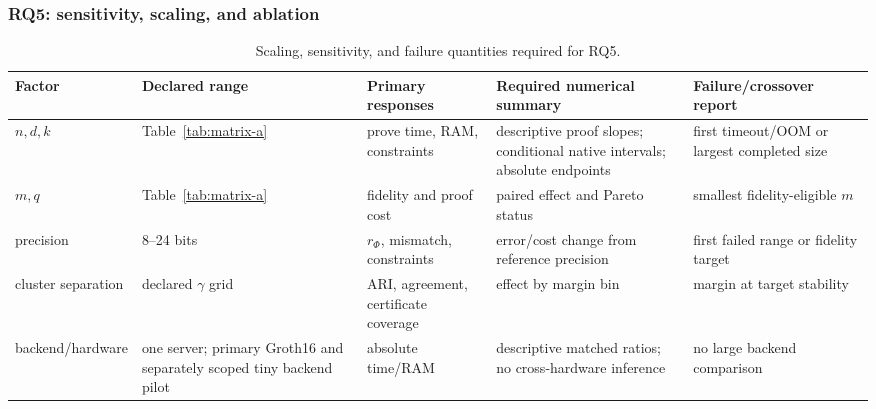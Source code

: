 \documentclass[pdflatex,sn-mathphys-num,iicol]{sn-jnl}
\theoremstyle{plain}
\theoremstyle{definition}
\theoremstyle{remark}
\begin{document}
\subsubsection{RQ5: sensitivity, scaling, and ablation}
\begin{table}[!htbp]
\caption{Scaling, sensitivity, and failure quantities required for RQ5.}\label{tab:sensitivity-a}
\centering\scriptsize
\begin{adjustbox}{max width=\textwidth}
\begin{tabularx}{\textwidth}{@{}Y Y Y Y Y@{}}
\toprule
Factor & Declared range & Primary responses & Required numerical summary & Failure/crossover report \\
\midrule
$n,d,k$ & Table~\ref{tab:matrix-a} & prove time, RAM, constraints & descriptive proof slopes; conditional native intervals; absolute endpoints & first timeout/OOM or largest completed size \\
$m,q$ & Table~\ref{tab:matrix-a} & fidelity and proof cost & paired effect and Pareto status & smallest fidelity-eligible $m$ \\
precision & 8--24 bits & $r_\Phi$, mismatch, constraints & error/cost change from reference precision & first failed range or fidelity target \\
cluster separation & declared $\gamma$ grid & ARI, agreement, certificate coverage & effect by margin bin & margin at target stability \\
backend/hardware & one server; primary Groth16 and separately scoped tiny backend pilot & absolute time/RAM & descriptive matched ratios; no cross-hardware inference & no large backend comparison \\
\bottomrule
\end{tabularx}
\end{adjustbox}
\end{table}
\end{document}
